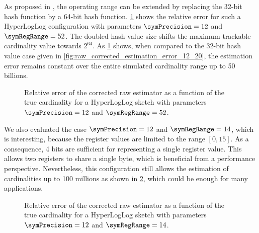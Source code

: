 \documentclass[a4paper]{scrartcl}
\begin{document}
As proposed in \cite{Heule2013}, the operating range can be extended by
replacing the 32-bit hash function by a 64-bit hash function. \cref{fig:raw_corrected_estimation_error_12_52} shows the relative error for such a HyperLogLog configuration with parameters $\symPrecision=12$ and $\symRegRange=52$. The doubled hash value size shifts the maximum trackable cardinality value towards $2^{64}$. As \cref{fig:raw_corrected_estimation_error_12_52} shows, when compared to the 32-bit hash value case given in \cref{fig:raw_corrected_estimation_error_12_20}, the estimation error remains constant over the entire simulated cardinality range up to 50 billions.

\begin{figure}
\centering

\caption{Relative error of the corrected raw estimator as a function of the true cardinality for a HyperLogLog sketch with parameters $\symPrecision = 12$ and $\symRegRange=52$.}
\label{fig:raw_corrected_estimation_error_12_52}
\end{figure}

We also evaluated the case $\symPrecision = 12$ and $\symRegRange=14$, which is interesting, because the register values are limited to the range $[0, 15]$. As a consequence, 4 bits are sufficient for representing a single register value. This allows two registers to share a single byte, which is beneficial from a performance perspective. Nevertheless, this configuration still allows the estimation of cardinalities up to 100 millions as shown in \cref{fig:raw_corrected_estimation_error_12_14}, which could be enough for many applications.

\begin{figure}
\centering

\caption{Relative error of the corrected raw estimator as a function of the true cardinality for a HyperLogLog sketch with parameters $\symPrecision = 12$ and $\symRegRange=14$.}
\label{fig:raw_corrected_estimation_error_12_14}
\end{figure}
\end{document}

